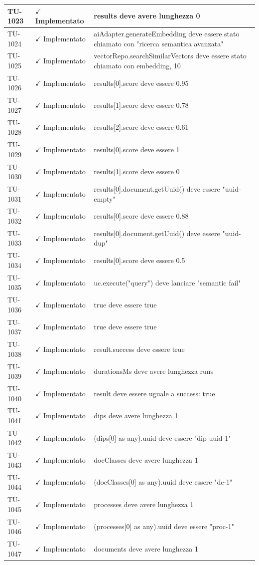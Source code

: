 ﻿\documentclass[a4paper,12pt]{article}
\newcommand{\ok}{\textcolor{green!60!black}{$\checkmark$ Implementato}}
\begin{document}
\begin{longtable}{|p{2cm}|p{3.5cm}|p{9.5cm}|}
\hline
TU-1023 & \ok & results deve avere lunghezza 0 \\
\hline
TU-1024 & \ok & aiAdapter.generateEmbedding deve essere stato chiamato con "ricerca semantica avanzata" \\
\hline
TU-1025 & \ok & vectorRepo.searchSimilarVectors deve essere stato chiamato con embedding, 10 \\
\hline
TU-1026 & \ok & results[0].score deve essere 0.95 \\
\hline
TU-1027 & \ok & results[1].score deve essere 0.78 \\
\hline
TU-1028 & \ok & results[2].score deve essere 0.61 \\
\hline
TU-1029 & \ok & results[0].score deve essere 1 \\
\hline
TU-1030 & \ok & results[1].score deve essere 0 \\
\hline
TU-1031 & \ok & results[0].document.getUuid() deve essere "uuid-empty" \\
\hline
TU-1032 & \ok & results[0].score deve essere 0.88 \\
\hline
TU-1033 & \ok & results[0].document.getUuid() deve essere "uuid-dup" \\
\hline
TU-1034 & \ok & results[0].score deve essere 0.5 \\
\hline
TU-1035 & \ok & uc.execute("query") deve lanciare "semantic fail" \\
\hline
TU-1036 & \ok & true deve essere true \\
\hline
TU-1037 & \ok & true deve essere true \\
\hline
TU-1038 & \ok & result.success deve essere true \\
\hline
TU-1039 & \ok & durationsMs deve avere lunghezza runs \\
\hline
TU-1040 & \ok & result deve essere uguale a { success: true } \\
\hline
TU-1041 & \ok & dips deve avere lunghezza 1 \\
\hline
TU-1042 & \ok & (dips[0] as any).uuid deve essere "dip-uuid-1" \\
\hline
TU-1043 & \ok & docClasses deve avere lunghezza 1 \\
\hline
TU-1044 & \ok & (docClasses[0] as any).uuid deve essere "dc-1" \\
\hline
TU-1045 & \ok & processes deve avere lunghezza 1 \\
\hline
TU-1046 & \ok & (processes[0] as any).uuid deve essere "proc-1" \\
\hline
TU-1047 & \ok & documents deve avere lunghezza 1 \\

\end{longtable}
\end{document}
